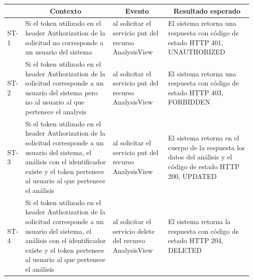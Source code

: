 \documentclass[a4paper,12pt]{article}
\begin{document}
\begin{longtable}{|p{1.0cm}|p{4cm}|p{4cm}|p{4cm}| }

	\hline
		\rowcolor[gray]{0.9} 
		\multicolumn{1}{|c}{Id test seguridad} & \multicolumn{1}{|c|}{Contexto} & \multicolumn{1}{|c|}{Evento} & \multicolumn{1}{|c|}{Resultado esperado} \\
	\hline
		ST-1 & Si el token utilizado en el header Authorization de la solicitud no corresponde a un usuario del sistema  & al solicitar el servicio put del recurso AnalysisView & El sistema retorna una respuesta con código de estado HTTP 401, UNAUTHORIZED\\
	\hline
		ST-2 & Si el token utilizado en el header Authorization de la solicitud corresponde a un usuario del sistema pero no al usuario al que pertenece el analysis & al solicitar el servicio put del recurso AnalysisView & El sistema retorna una respuesta con código de estado HTTP 403, FORBIDDEN\\
	\hline
		ST-3 & Si el token utilizado en el header Authorization de la solicitud corresponde a un usuario del sistema, el análisis con el identificador existe y el token pertenece al usuario al que pertenece el análisis & al solicitar el servicio put del recurso AnalysisView & El sistema retorna en el cuerpo de la respuesta los datos del análisis y el código de estado HTTP 200, UPDATED\\
	\hline
		ST-4 & Si el token utilizado en el header Authorization de la solicitud corresponde a un usuario del sistema, el análisis con el identificador existe y el token pertenece al usuario al que pertenece el análisis & al solicitar el servicio delete del recurso AnalysisView & El sistema retorna la respuesta con código de estado HTTP 204, DELETED\\
	\hline

\end{longtable}
\end{document}
